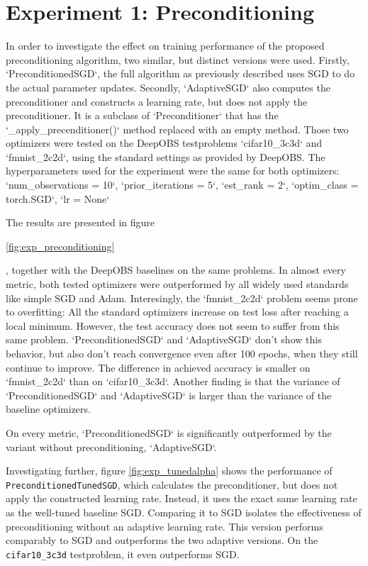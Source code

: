 \documentclass[twoside,12pt,a4paper]{report}
\begin{document}
\section{Experiment 1: Preconditioning}
\begin{markdown}
In order to investigate the effect on training performance of the proposed preconditioning algorithm, two similar, but distinct versions were used. Firstly, `PreconditionedSGD`, the full algorithm as previously described uses SGD to do the actual parameter updates. Secondly, `AdaptiveSGD` also computes the preconditioner and constructs a learning rate, but does not apply the preconditioner. It is a subclass of `Preconditioner` that has the `_apply_precenditioner()` method replaced with an empty method. Those two optimizers were tested on the DeepOBS testproblems `cifar10_3c3d` and `fmnist_2c2d`, using the standard settings as provided by DeepOBS.
The hyperparameters used for the experiment were the same for both optimizers: `num_observations = 10`, `prior_iterations = 5`, `est_rank = 2`, `optim_class = torch.SGD`, `lr = None`

The results are presented in figure \end{markdown}
\ref{fig:exp_preconditioning}
\begin{markdown}, together with the DeepOBS baselines on the same problems. In almost every metric, both tested optimizers were outperformed by all widely used standards like simple SGD and Adam. Interesingly, the `fmnist_2c2d` problem seems prone to overfitting: All the standard optimizers increase on test loss after reaching a local minimum. However, the test accuracy does not seem to suffer from this same problem. `PreconditionedSGD` and `AdaptiveSGD` don't show this behavior, but also don't reach convergence even after 100 epochs, when they still continue to improve. The difference in achieved accuracy is smaller on `fmnist_2c2d` than on `cifar10_3c3d`.
Another finding is that the variance of `PreconditionedSGD` and `AdaptiveSGD` is larger than the variance of the baseline optimizers.

On every metric, `PreconditionedSGD` is significantly outperformed by the variant without preconditioning, `AdaptiveSGD`.
\end{markdown}

Investigating further, figure \ref{fig:exp_tunedalpha} shows the performance of \verb|PreconditionedTunedSGD|, which calculates the preconditioner, but does not apply the constructed learning rate. Instead, it uses the exact same learning rate as the well-tuned baseline SGD. Comparing it to SGD isolates the effectiveness of preconditioning without an adaptive learning rate. This version performs comparably to SGD and outperforms the two adaptive versions. On the \verb|cifar10_3c3d| testproblem, it even outperforms SGD.
\end{document}
